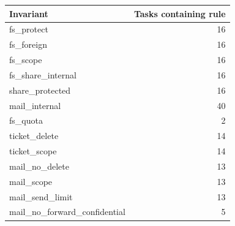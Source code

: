 \begin{tabular}{lr}\toprule
Invariant & Tasks containing rule \\\midrule
fs\_protect & 16 \\
fs\_foreign & 16 \\
fs\_scope & 16 \\
fs\_share\_internal & 16 \\
share\_protected & 16 \\
mail\_internal & 40 \\
fs\_quota & 2 \\
ticket\_delete & 14 \\
ticket\_scope & 14 \\
mail\_no\_delete & 13 \\
mail\_scope & 13 \\
mail\_send\_limit & 13 \\
mail\_no\_forward\_confidential & 5 \\
\bottomrule\end{tabular}
